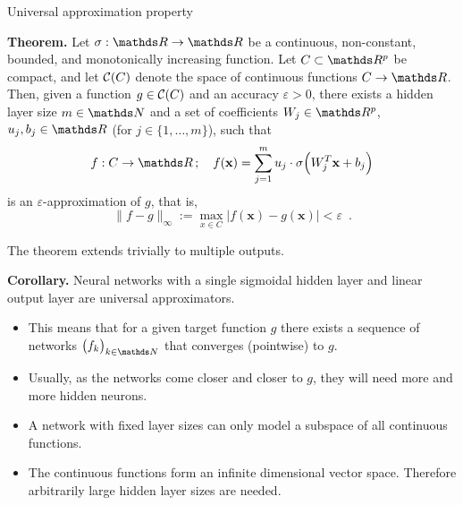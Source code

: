 \documentclass[11pt,compress,t,notes=noshow, xcolor=table]{beamer}
\date{}
\begin{document}



\begin{vbframe}{Universal approximation property}

  \textbf{Theorem.}
  Let $\sigma : \R \to \R$ be a continuous, non-constant, bounded, and
  monotonically increasing function. Let $C \subset \R^p$ be compact,
  and let $\mathcal{C}(C)$ denote the space of continuous functions $C \to \R$.
  Then, given a function $g \in \mathcal{C}(C)$ and an accuracy $\varepsilon > 0$,
  there exists a hidden layer size $m \in \N$ and a set of coefficients
  $W_j \in \R^p$, $u_j, b_j \in \R$
  (for $j \in \{1, \dots, m\}$), such that
  $$
    f : C \to \R \,;\quad f(\mathbf{x}) = \sum_{j=1}^m u_j \cdot \sigma \Big( W_j^T \mathbf{x} + b_j \Big)
  $$
  is an $\varepsilon$-approximation of $g$, that is,
  $$
    \|f - g\|_{\infty} := \max_{x \in C} |f(\mathbf{x}) - g(\mathbf{x})| < \varepsilon
    \enspace.
  $$

  The theorem extends trivially to multiple outputs.

  \framebreak

  \textbf{Corollary.}
  Neural networks with a single sigmoidal hidden layer and linear
  output layer are universal approximators.

  \begin{itemize}
    \item This means that for a given target function $g$ there exists a
    sequence of networks $\big( f_k \big)_{k \in \N}$ that converges
    (pointwise) to $g$.%
    \vspace{2mm}
    \item Usually, as the networks come closer and closer to $g$, they
    will need more and more hidden neurons.
    \vspace{2mm}
    \item A network with fixed layer sizes can only model a subspace of all
    continuous functions. %
    \vspace{2mm}
    \item The continuous functions form an infinite dimensional vector space.
    Therefore arbitrarily large hidden layer sizes are needed.
  \end{itemize}


\end{vbframe}
\end{document}
